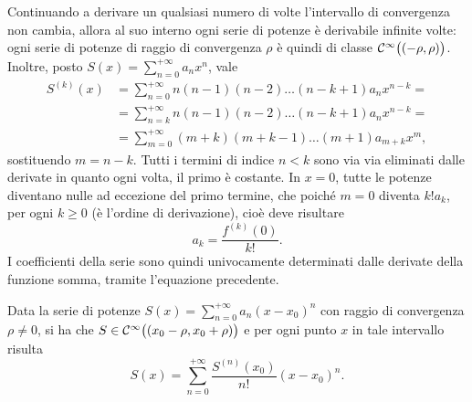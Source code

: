 Continuando a derivare un qualsiasi numero di volte l'intervallo di convergenza non cambia, allora al suo interno ogni serie di potenze è derivabile infinite volte: ogni serie di potenze di raggio di convergenza $\rho$ è quindi di classe $\mathcal{C}^{{\infty}}\big((-\rho,\rho)\big)$. Inoltre, posto $S(x)=\sum_{n=0}^{+\infty}a_nx^n$, vale
\[\begin{split}
S^{(k)}(x)	&=\sum_{n=0}^{+\infty}n(n-1)(n-2)\dots(n-k+1)a_nx^{n-k}=\\
			&=\sum_{n=k}^{+\infty}n(n-1)(n-2)\dots(n-k+1)a_nx^{n-k}=\\
			&=\sum_{m=0}^{+\infty}(m+k)(m+k-1)\dots(m+1)a_{m+k}x^m,
\end{split}\]
sostituendo $m=n-k$. Tutti i termini di indice $n<k$ sono via via eliminati dalle derivate in quanto ogni volta, il primo è costante.
In $x=0$, tutte le potenze diventano nulle ad eccezione del primo termine, che poiché $m=0$ diventa $k!a_k$, per ogni $k\geq 0$ (è l'ordine di derivazione), cioè deve risultare
\[
a_k=\frac{f^{(k)}(0)}{k!}.
\]
I coefficienti della serie sono quindi univocamente determinati dalle derivate della funzione somma, tramite l'equazione precedente.
\begin{teorema}
	Data la serie di potenze $S(x)=\sum_{n=0}^{+\infty}a_n(x-x_0)^n$ con raggio di convergenza $\rho\ne 0$, si ha che $S\in\mathcal{C}^{{\infty}}\big((x_0-\rho,x_0+\rho)\big)$ e per ogni punto $x$ in tale intervallo risulta
	\begin{equation} \label{eq:serie_potenze_taylor}
		S(x)=\sum_{n=0}^{+\infty}\frac{S^{(n)}(x_0)}{n!}(x-x_0)^n.
	\end{equation}
\end{teorema}
